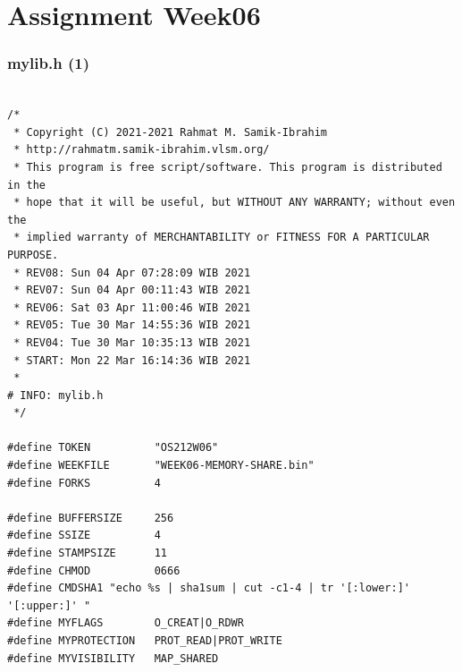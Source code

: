 \documentclass[aspectratio=169, xcolor=table, notheorems, hyperref={pdfpagelabels=false}]{beamer}
\begin{document}
\section{Assignment Week06}
\begin{frame}[fragile]
\frametitle{mylib.h (1)}
\begin{lstlisting}[basicstyle=\ttfamily\tiny]         % 108

/*
 * Copyright (C) 2021-2021 Rahmat M. Samik-Ibrahim
 * http://rahmatm.samik-ibrahim.vlsm.org/
 * This program is free script/software. This program is distributed in the
 * hope that it will be useful, but WITHOUT ANY WARRANTY; without even the
 * implied warranty of MERCHANTABILITY or FITNESS FOR A PARTICULAR PURPOSE.
 * REV08: Sun 04 Apr 07:28:09 WIB 2021
 * REV07: Sun 04 Apr 00:11:43 WIB 2021
 * REV06: Sat 03 Apr 11:00:46 WIB 2021
 * REV05: Tue 30 Mar 14:55:36 WIB 2021
 * REV04: Tue 30 Mar 10:35:13 WIB 2021
 * START: Mon 22 Mar 16:14:36 WIB 2021
 *
# INFO: mylib.h
 */

#define TOKEN          "OS212W06"
#define WEEKFILE       "WEEK06-MEMORY-SHARE.bin"
#define FORKS          4

#define BUFFERSIZE     256
#define SSIZE          4
#define STAMPSIZE      11
#define CHMOD          0666
#define CMDSHA1 "echo %s | sha1sum | cut -c1-4 | tr '[:lower:]' '[:upper:]' "
#define MYFLAGS        O_CREAT|O_RDWR
#define MYPROTECTION   PROT_READ|PROT_WRITE
#define MYVISIBILITY   MAP_SHARED

\end{lstlisting}
\end{frame}
\end{document}
